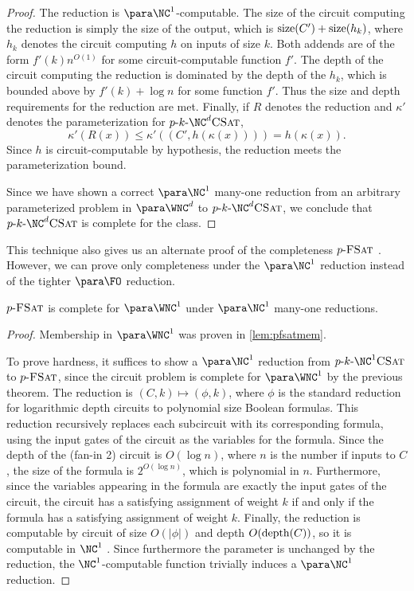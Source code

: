\begin{proof}
  The reduction is $\para \NC^1$-computable.
  The size of the circuit computing the reduction is simply the size of the output, which is $\operatorname{size}(C') + \operatorname{size}(h_k)$, where $h_k$ denotes the circuit computing $h$ on inputs of size $k$.
  Both addends are of the form $f'(k) n^{O(1)}$ for some circuit-computable function $f'$.
  The depth of the circuit computing the reduction is dominated by the depth of the $h_k$, which is bounded above by $f'(k) + \log n$ for some function $f'$.
  Thus the size and depth requirements for the reduction are met.
  Finally, if $R$ denotes the reduction and $\kappa'$ denotes the parameterization for $\pNCSAT$,
  \[
  \kappa'(R(x)) \leq \kappa'((C', h(\kappa(x)))) = h(\kappa(x)).
  \]
  Since $h$ is circuit-computable by hypothesis, the reduction meets the parameterization bound.

  Since we have shown a correct $\para \NC^1$ many-one reduction from an arbitrary parameterized problem in $\para \WNC^d$ to $\pNCSAT$, we conclude that $\pNCSAT$ is complete for the class.
\end{proof}

This technique also gives us an alternate proof of the completeness $p \textnormal{-} \textsc{FSat}$ \autocite[Theorem~3.6]{est15}.
However, we can prove only completeness under the $\para \NC^1$ reduction instead of the tighter $\para \FO$ reduction.

\begin{theorem}\label{thm:pfsatcomplete}
  $p \textnormal{-} \textsc{FSat}$ is complete for $\para \WNC^1$ under $\para \NC^1$ many-one reductions.
\end{theorem}
\begin{proof}
  Membership in $\para \WNC^1$ was proven in \autoref{lem:pfsatmem}.

  To prove hardness, it suffices to show a $\para \NC^1$ reduction from $p \dash k \dash \NC^1 \textsc{CSat}$ to $p \textnormal{-} \textsc{FSat}$, since the circuit problem is complete for $\para \WNC^1$ by the previous theorem.
  The reduction is $(C, k) \mapsto (\phi, k)$, where $\phi$ is the standard reduction for logarithmic depth circuits to polynomial size Boolean formulas.
  This reduction recursively replaces each subcircuit with its corresponding formula, using the input gates of the circuit as the variables for the formula.
  Since the depth of the (fan-in 2) circuit is $O(\log n)$, where $n$ is the number if inputs to $C$, the size of the formula is $2^{O(\log n)}$, which is polynomial in $n$.
  Furthermore, since the variables appearing in the formula are exactly the input gates of the circuit, the circuit has a satisfying assignment of weight $k$ if and only if the formula has a satisfying assignment of weight $k$.
  Finally, the reduction is computable by circuit of size $O(|\phi|)$ and depth $O(\operatorname{depth}(C))$, so it is computable in $\NC^1$ .
  Since furthermore the parameter is unchanged by the reduction, the $\NC^1$-computable function trivially induces a $\para \NC^1$ reduction.
\end{proof}

